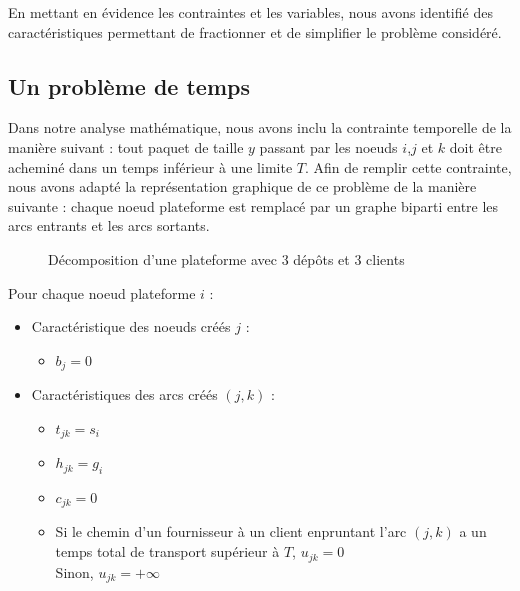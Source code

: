 \documentclass[a4paper,12pt]{article}
\begin{document}
En mettant en évidence les contraintes et les variables, nous avons identifié des caractéristiques permettant de fractionner et de simplifier le problème considéré.


\subsection{Un problème de temps}
Dans notre analyse mathématique, nous avons inclu la contrainte temporelle de la manière suivant : tout paquet de taille $y$ passant par les noeuds $i$,$j$ et $k$ doit être acheminé dans un temps inférieur à une limite $T$. Afin de remplir cette contrainte, nous avons adapté la représentation graphique de ce problème de la manière suivante : chaque noeud plateforme est remplacé par un graphe biparti entre les arcs entrants et les arcs sortants. 


\begin{figure}[H]
    \begin{center}
    \end{center}
    \caption{Décomposition d'une plateforme avec 3 dépôts et 3 clients}
\end{figure}
 
Pour chaque noeud plateforme $i$ :
\begin{itemize}
    \item Caractéristique des noeuds créés $j$ :
        \begin{itemize}
            \item $b_j = 0$
        \end{itemize}
    \item Caractéristiques des arcs créés $(j,k)$ :
        \begin{itemize}
            \item $t_{jk} = s_i$
            \item $h_{jk} = g_i$
            \item $c_{jk} = 0$
            \item Si le chemin d'un fournisseur à un client enpruntant l'arc $(j,k)$ a un temps total de transport supérieur à $T$, $u_{jk} = 0$ \\
            Sinon, $u_{jk} = + \infty$
        \end{itemize}
\end{itemize}
\end{document}
